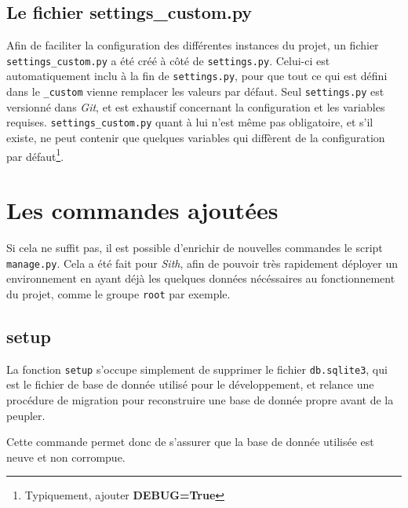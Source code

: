 \documentclass[a4paper]{report}
\begin{document}
\subsection{Le fichier \textbf{settings\_custom.py}}
\label{sub:le_fichier_settings_custom.py}
\par Afin de faciliter la configuration des différentes instances du projet, un fichier \verb#settings_custom.py# a été
créé à côté de \verb#settings.py#. Celui-ci est automatiquement inclu à la fin de \verb#settings.py#, pour que tout ce
qui est défini dans le \verb#_custom# vienne remplacer les valeurs par défaut. Seul \verb#settings.py# est versionné
dans \emph{Git}, et est exhaustif concernant la configuration et les variables requises. \verb#settings_custom.py# quant
à lui n'est même pas obligatoire, et s'il existe, ne peut contenir que quelques variables qui diffèrent de la
configuration par défaut\footnote{Typiquement, ajouter \textbf{DEBUG=True} }.


\section{Les commandes ajoutées}
\label{sec:les_commandes_ajoutees}
\par Si cela ne suffit pas, il est possible d'enrichir de nouvelles commandes le script \verb#manage.py#. Cela a été fait
pour \emph{Sith}, afin de pouvoir très rapidement déployer un environnement en ayant déjà les quelques données
nécéssaires au fonctionnement du projet, comme le groupe \verb#root# par exemple.

\subsection{setup}
\label{sub:setup}
\par La fonction \verb#setup# s'occupe simplement de supprimer le fichier \verb#db.sqlite3#, qui est le fichier de base
de donnée utilisé pour le développement, et relance une procédure de migration pour reconstruire une base de donnée
propre avant de la peupler.
\par Cette commande permet donc de s'assurer que la base de donnée utilisée est neuve et non corrompue.
\end{document}
